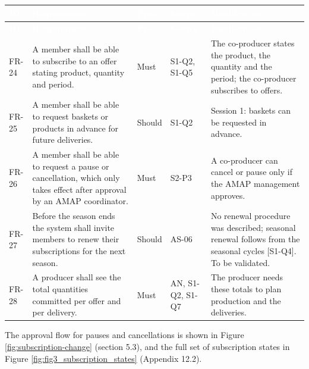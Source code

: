 \documentclass[11pt,a4paper]{article}
\begin{document}
{\footnotesize
\begin{longtable}{>{\raggedright\arraybackslash\hspace{0pt}}p{}>{\raggedright\arraybackslash\hspace{0pt}}p{}>{\raggedright\arraybackslash\hspace{0pt}}p{}>{\raggedright\arraybackslash\hspace{0pt}}p{}>{\raggedright\arraybackslash\hspace{0pt}}p{}}
\rowcolor{hdr}\textcolor{white}{\textbf{ID}} & \textcolor{white}{\textbf{Requirement}} & \textcolor{white}{\textbf{Prio.}} & \textcolor{white}{\textbf{Source}} & \textcolor{white}{\textbf{Justification}} \\ \endfirsthead
\rowcolor{hdr}\textcolor{white}{\textbf{ID}} & \textcolor{white}{\textbf{Requirement}} & \textcolor{white}{\textbf{Prio.}} & \textcolor{white}{\textbf{Source}} & \textcolor{white}{\textbf{Justification}} \\ \endhead
FR-24 & A member shall be able to subscribe to an offer stating product, quantity and period. & Must & S1-Q2, S1-Q5 & The co-producer states the product, the quantity and the period; the co-producer subscribes to offers. \\ \hline
FR-25 & A member shall be able to request baskets or products in advance for future deliveries. & Should & S1-Q2 & Session 1: baskets can be requested in advance. \\ \hline
FR-26 & A member shall be able to request a pause or cancellation, which only takes effect after approval by an AMAP coordinator. & Must & S2-P3 & A co-producer can cancel or pause only if the AMAP management approves. \\ \hline
FR-27 & Before the season ends the system shall invite members to renew their subscriptions for the next season. & Should & AS-06 & No renewal procedure was described; seasonal renewal follows from the seasonal cycles [S1-Q4]. To be validated. \\ \hline
FR-28 & A producer shall see the total quantities committed per offer and per delivery. & Must & AN, S1-Q2, S1-Q7 & The producer needs these totals to plan production and the deliveries. \\ \hline
\end{longtable}}
\addtocounter{table}{-1}
The approval flow for pauses and cancellations is shown in Figure \ref{fig:subscription-change} (section 5.3), and the full set of subscription states in Figure \ref{fig:fig3_subscription_states} (Appendix 12.2).
\end{document}
